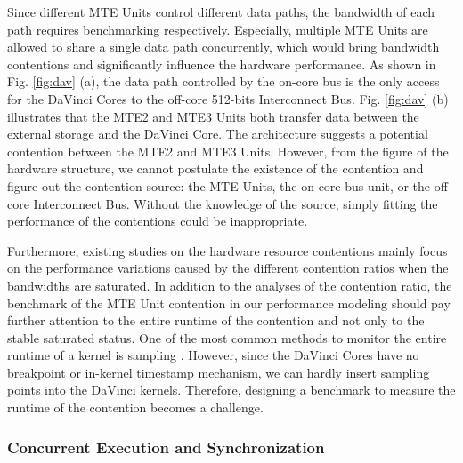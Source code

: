 \documentclass[12pt]{extbook}
\begin{document}
Since different MTE Units control different data paths, the bandwidth of each path requires benchmarking respectively. Especially, multiple MTE Units are allowed to share a single data path concurrently, which would bring bandwidth contentions and significantly influence the hardware performance. As shown in Fig. \ref{fig:dav} (a), the data path controlled by the on-core bus is the only access for the DaVinci Cores to the off-core 512-bits Interconnect Bus. Fig. \ref{fig:dav} (b) illustrates that the MTE2 and MTE3 Units both transfer data between the external storage and the DaVinci Core. The architecture suggests a potential contention between the MTE2 and MTE3 Units. However, from the figure of the hardware structure, we cannot postulate the existence of the contention and figure out the contention source: the MTE Units, the on-core bus unit, or the off-core Interconnect Bus. Without the knowledge of the source, simply fitting the performance of the contentions could be inappropriate.

Furthermore, existing studies on the hardware resource contentions \cite{DBLP:conf/sc/HristeaLK97, DBLP:conf/usenix/SrikanthanDS15} mainly focus on the performance variations caused by the different contention ratios when the bandwidths are saturated. In addition to the analyses of the contention ratio, the benchmark of the MTE Unit contention in our performance modeling should pay further attention to the entire runtime of the contention and not only to the stable saturated status. One of the most common methods to monitor the entire runtime of a kernel is sampling \cite{IBM_profiler, Del_profiler, Goo_profiler}. However, since the DaVinci Cores have no breakpoint or in-kernel timestamp mechanism, we can hardly insert sampling points into the DaVinci kernels. Therefore, designing a benchmark to measure the runtime of the contention becomes a challenge.

\subsubsection{Concurrent Execution and Synchronization}
\end{document}

